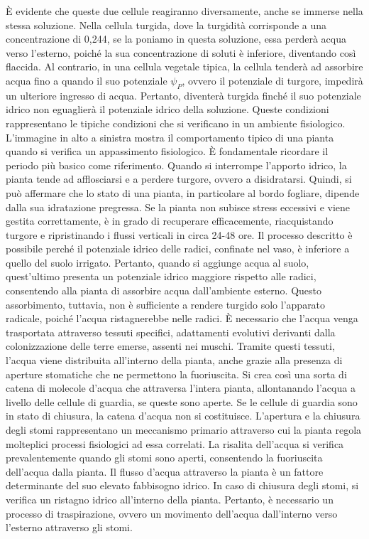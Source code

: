 \documentclass[11pt, a4paper]{article}
\begin{document}
\begin{spacing}{1}
È evidente che queste due cellule reagiranno diversamente, anche se immerse nella stessa soluzione. Nella cellula turgida, dove la turgidità corrisponde a una concentrazione di 0,244, se la poniamo in questa soluzione, essa perderà acqua verso l'esterno, poiché la sua concentrazione di soluti è inferiore, diventando così flaccida. Al contrario, in una cellula vegetale tipica, la cellula tenderà ad assorbire acqua fino a quando il suo potenziale $\psi_P$, ovvero il potenziale di turgore, impedirà un ulteriore ingresso di acqua. Pertanto, diventerà turgida finché il suo potenziale idrico non eguaglierà il potenziale idrico della soluzione. Queste condizioni rappresentano le tipiche condizioni che si verificano in un ambiente fisiologico.
L'immagine in alto a sinistra mostra il comportamento tipico di una pianta quando si verifica un appassimento fisiologico. È fondamentale ricordare il periodo più basico come riferimento. Quando si interrompe l'apporto idrico, la pianta tende ad afflosciarsi e a perdere turgore, ovvero a disidratarsi. Quindi, si può affermare che lo stato di una pianta, in particolare al bordo fogliare, dipende dalla sua idratazione pregressa. Se la pianta non subisce stress eccessivi e viene gestita correttamente, è in grado di recuperare efficacemente, riacquistando turgore e ripristinando i flussi verticali in circa 24-48 ore.
Il processo descritto è possibile perché il potenziale idrico delle radici, confinate nel vaso, è inferiore a quello del suolo irrigato. Pertanto, quando si aggiunge acqua al suolo, quest'ultimo presenta un potenziale idrico maggiore rispetto alle radici, consentendo alla pianta di assorbire acqua dall'ambiente esterno. Questo assorbimento, tuttavia, non è sufficiente a rendere turgido solo l'apparato radicale, poiché l'acqua ristagnerebbe nelle radici. È necessario che l'acqua venga trasportata attraverso tessuti specifici, adattamenti evolutivi derivanti dalla colonizzazione delle terre emerse, assenti nei muschi. Tramite questi tessuti, l'acqua viene distribuita all'interno della pianta, anche grazie alla presenza di aperture stomatiche che ne permettono la fuoriuscita. Si crea così una sorta di catena di molecole d'acqua che attraversa l'intera pianta, allontanando l'acqua a livello delle cellule di guardia, se queste sono aperte.
Se le cellule di guardia sono in stato di chiusura, la catena d'acqua non si costituisce. L'apertura e la chiusura degli stomi rappresentano un meccanismo primario attraverso cui la pianta regola molteplici processi fisiologici ad essa correlati. La risalita dell'acqua si verifica prevalentemente quando gli stomi sono aperti, consentendo la fuoriuscita dell'acqua dalla pianta. Il flusso d'acqua attraverso la pianta è un fattore determinante del suo elevato fabbisogno idrico. In caso di chiusura degli stomi, si verifica un ristagno idrico all'interno della pianta. Pertanto, è necessario un processo di traspirazione, ovvero un movimento dell'acqua dall'interno verso l'esterno attraverso gli stomi.

\end{spacing}
\end{document}
